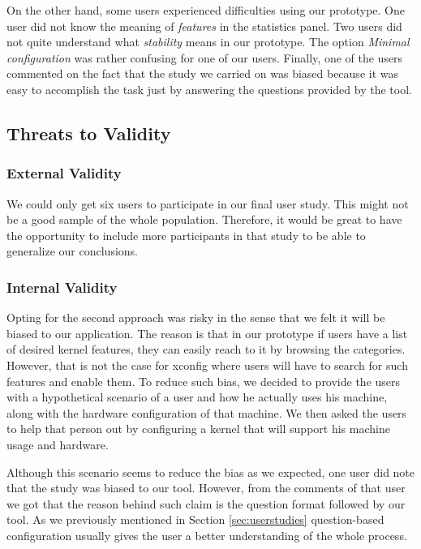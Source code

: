 \documentclass{chi2009}
\begin{document}
On the other hand, some users experienced difficulties using our prototype. One user did not know the meaning of \textit{features} in the statistics panel. Two
users did not quite understand what \textit{stability} means in our prototype. The option \textit{Minimal configuration} was rather confusing for one of our
users. Finally, one of the users commented on the fact that the study we carried on was biased because it was easy to accomplish the task just by answering the
questions provided by the tool.

\subsection{Threats to Validity}

\subsubsection{External Validity}
We could only get six users to participate in our final user study. This might not be a good sample of the whole population. Therefore, it would be great to
have the opportunity to include more participants in that study to be able to generalize our conclusions.

\subsubsection{Internal Validity}
Opting for the second approach was risky in the sense that we felt it will be biased to our application. The reason is that in our prototype if users have a
list of desired kernel features, they can easily reach to it by browsing the categories. However, that is not the case for \textsf{xconfig} where users will
have to search for such features and enable them. To reduce such bias, we decided to provide the users with a hypothetical scenario of a user and how he
actually uses his machine, along with the hardware configuration of that machine. We then asked the users to help that person out by configuring a kernel that
will support his machine usage and hardware.

Although this scenario seems to reduce the bias as we expected, one user did note that the study was biased to our tool. However, from the comments of that
user we got that the reason behind such claim is the question format followed by our tool. As we previously mentioned in Section \ref{sec:userstudies}
question-based configuration usually gives the user a better understanding of the whole process.
\end{document}

